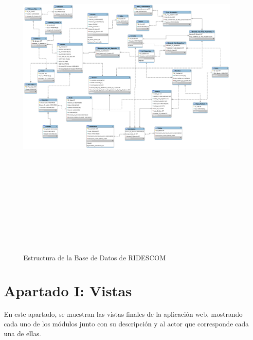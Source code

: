 		\label{BasedeDatos}
		\begin{figure}[hbt!]
			\centering
			\includegraphics[angle=90, width=14cm, height=19cm]{Imagenes/RIDESCOM.png}
			\caption{Estructura de la Base de Datos de RIDESCOM}
			\label{BaseDatos}
		\end{figure}
		
		
	
	\pagebreak
		
	\chapter{Apartado I: Vistas}
	\noindent En este apartado, se muestran las vistas finales de la aplicación web, mostrando cada uno de los módulos junto con su descripción y al actor que corresponde cada una de ellas.
		

